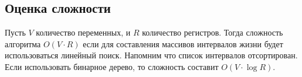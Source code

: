 \begin{example}
\end{example}

\subsection{Оценка сложности}

Пусть $V$ количество переменных, и $R$ количество регистров.
Тогда сложность алгоритма $\textit{O}(V \cdot R)$ если для составления массивов интервалов жизни будет использоваться
линейный поиск.
Напомним что список интервалов отсортирован.
Если использовать бинарное дерево, то сложность составит $\textit{O}(V \cdot \log R)$.
